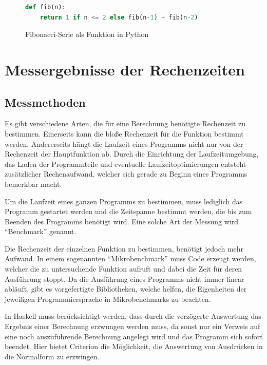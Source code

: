 \documentclass[11pt, parskip=half]{scrartcl}       %
\begin{document}
\begin{figure}[h]
  \centering
\begin{lstlisting}[language=python]
  def fib(n):
	return 1 if n <= 2 else fib(n-1) + fib(n-2)
\end{lstlisting}  
  \caption{Fibonacci-Serie als Funktion in Python}
  \label{fig:code-python}
\end{figure}


\section{Messergebnisse der Rechenzeiten}

\subsection{Messmethoden}

Es gibt verschiedene Arten, die für eine Berechnung benötigte Rechenzeit zu bestimmen.
Einerseits kann die bloße Rechenzeit für die Funktion bestimmt werden.
Andererseits hängt die Laufzeit eines Programms nicht nur von der Rechenzeit der Hauptfunktion ab.
Durch die Einrichtung der Laufzeitumgebung, das Laden der Programmteile und eventuelle Laufzeitoptimierungen entsteht zusätzlicher Rechenaufwand, welcher sich gerade zu Beginn eines Programms bemerkbar macht.

Um die Laufzeit eines ganzen Programms zu bestimmen, muss lediglich das Programm gestartet werden und die Zeitspanne bestimmt werden, die bis zum Beenden des Programms benötigt wird.
Eine solche Art der Messung wird ``Benchmark'' genannt.

Die Rechenzeit der einzelnen Funktion zu bestimmen, benötigt jedoch mehr Aufwand.
In einem sogenannten ``Mikrobenchmark'' muss Code erzeugt werden, welcher die zu untersuchende Funktion aufruft und dabei die Zeit für deren Ausführung stoppt.
Da die Ausführung eines Programms nicht immer linear abläuft\cite{ibm_anatomy_flawed_microbenchmark}, gibt es vorgefertigte Bibliotheken, welche helfen, die Eigenheiten der jeweiligen Programmiersprache in Mikrobenchmarks zu beachten.

In Haskell muss berücksichtigt werden, dass durch die verzögerte Auswertung das Ergebnis einer Berechnung erzwungen werden muss, da sonst nur ein Verweis auf eine noch auszuführende Berechnung angelegt wird und das Programm sich sofort beendet.
Hier bietet Criterion\cite{criterion} die Möglichkeit, die Auswertung von Ausdrücken in die Normalform\cite{haskell_whnf} zu erzwingen.
\end{document}
